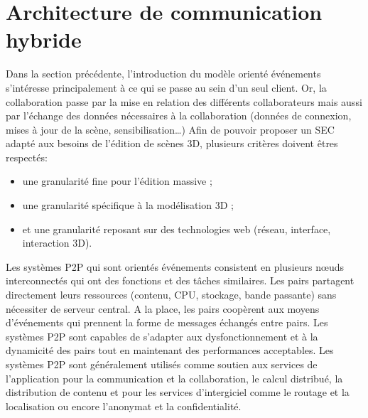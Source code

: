 \section{Architecture de communication hybride}


Dans la section précédente, l'introduction du modèle orienté événements 
s'intéresse principalement à ce qui se passe au sein d'un seul client. 
Or, la collaboration passe par la mise en relation des différents collaborateurs mais aussi par  
l'échange des données nécessaires à la collaboration (données de connexion, 
mises à jour de la scène, sensibilisation\dots )
Afin de pouvoir proposer un \gls{SEC} adapté aux besoins de l'édition de scènes 
3D, plusieurs critères doivent êtres respectés: 
\begin{itemize}
	\item une granularité fine pour l'édition massive ;
	\item une granularité spécifique à la modélisation 3D ;
	\item et une granularité reposant sur des technologies web (réseau, interface, interaction 3D).
\end{itemize}

Les systèmes \gls{P2P} qui sont orientés événements consistent en plusieurs 
n\oe uds interconnectés qui ont des fonctions et des tâches 
similaires. Les pairs partagent directement leurs ressources (contenu, CPU, 
stockage, bande passante) sans nécessiter de serveur central. A la place, les 
pairs coopèrent aux moyens d'événements qui prennent la forme de messages 
échangés entre pairs. Les systèmes \gls{P2P} sont capables de s'adapter aux 
dysfonctionnement et à la dynamicité des pairs tout en maintenant des 
performances acceptables. Les systèmes \gls{P2P} sont généralement utilisés 
comme soutien aux services de l'application pour la communication et la 
collaboration, le calcul distribué, la distribution de contenu et pour les services 
d'intergiciel comme le routage et la localisation ou encore l'anonymat et la confidentialité.

